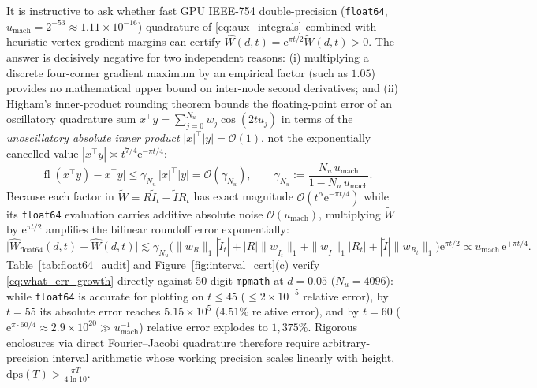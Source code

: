 \documentclass[11pt,a4paper,reqno]{amsart}
\theoremstyle{definition}
\theoremstyle{remark}
\numberwithin{equation}{section}
\newcommand{\ee}{\mathrm{e}}
\newcommand{\Wtil}{\widetilde{W}}
\newcommand{\What}{\widehat{W}}
\begin{document}
It is instructive to ask whether fast GPU IEEE-754 double-precision (\texttt{float64}, $u_{\mathrm{mach}} = 2^{-53} \approx 1.11 \times 10^{-16}$) quadrature of \eqref{eq:aux_integrals} combined with heuristic vertex-gradient margins can certify $\What(d,t) = \ee^{\pi t/2}\Wtil(d,t) > 0$. The answer is decisively negative for two independent reasons: (i) multiplying a discrete four-corner gradient maximum by an empirical factor (such as $1.05$) provides no mathematical upper bound on inter-node second derivatives; and (ii) Higham's inner-product rounding theorem \cite[Theorem~3.1]{Higham2002} bounds the floating-point error of an oscillatory quadrature sum $x^\top y = \sum_{j=0}^{N_u} w_j \cos(2t u_j)$ in terms of the \emph{unoscillatory absolute inner product} $|x|^\top|y| = \mathcal{O}(1)$, not the exponentially cancelled value $|x^\top y| \asymp t^{7/4}\ee^{-\pi t/4}$:
\begin{equation}\label{eq:higham_true}
\big|\operatorname{fl}(x^\top y) - x^\top y\big| \le \gamma_{N_u}\,|x|^\top |y| = \mathcal{O}(\gamma_{N_u}), \qquad \gamma_{N_u} := \frac{N_u\,u_{\mathrm{mach}}}{1 - N_u\,u_{\mathrm{mach}}}.
\end{equation}
Because each factor in $\Wtil = R\widetilde{I}_t - \widetilde{I}R_t$ has exact magnitude $\mathcal{O}(t^{\alpha}\ee^{-\pi t/4})$ while its \texttt{float64} evaluation carries additive absolute noise $\mathcal{O}(u_{\mathrm{mach}})$, multiplying $\Wtil$ by $\ee^{\pi t/2}$ amplifies the bilinear roundoff error exponentially:
\begin{equation}\label{eq:what_err_growth}
\big|\What_{\mathrm{float64}}(d,t) - \What(d,t)\big| \lesssim \gamma_{N_u}\Big(\|w_R\|_1|\widetilde{I}_t| + |R|\|w_{\widetilde{I}_t}\|_1 + \|w_{\widetilde{I}}\|_1|R_t| + |\widetilde{I}|\|w_{R_t}\|_1\Big)\ee^{\pi t/2} \propto u_{\mathrm{mach}}\,\ee^{+\pi t/4}.
\end{equation}
Table~\ref{tab:float64_audit} and Figure~\ref{fig:interval_cert}(c) verify \eqref{eq:what_err_growth} directly against 50-digit \texttt{mpmath} at $d = 0.05$ ($N_u = 4096$): while \texttt{float64} is accurate for plotting on $t \le 45$ ($\le 2 \times 10^{-5}$ relative error), by $t = 55$ its absolute error reaches $5.15 \times 10^5$ ($4.51\%$ relative error), and by $t = 60$ ($\ee^{\pi\cdot 60/4} \approx 2.9 \times 10^{20} \gg u_{\mathrm{mach}}^{-1}$) relative error explodes to $1{,}375\%$. Rigorous enclosures via direct Fourier--Jacobi quadrature therefore require arbitrary-precision interval arithmetic whose working precision scales linearly with height, $\mathrm{dps}(T) > \frac{\pi T}{4\ln 10}$.
\end{document}
